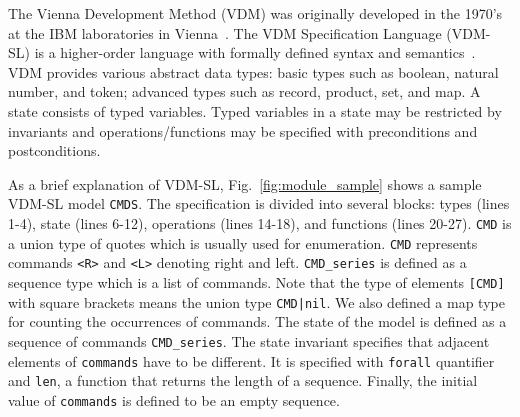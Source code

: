
The Vienna Development Method (VDM) was originally developed in the 1970's at the IBM laboratories in Vienna~\cite{DBLP:conf/fm/1978}. The VDM Specification Language (VDM-SL) is a higher-order language with formally defined syntax and semantics~\cite{Prehn:1991:LNCS551,Larsen1995585}. VDM provides various abstract data types: basic types such as boolean, natural number, and token; advanced types such as record, product, set, and map. A state consists of typed variables. Typed variables in a state may be restricted by invariants and operations/functions may be specified with preconditions and postconditions.

As a brief explanation of VDM-SL, Fig.~\ref{fig:module_sample} shows a sample VDM-SL model {\tt CMDS}. The specification is divided into several blocks: types (lines 1-4), state (lines 6-12), operations (lines 14-18), and functions (lines 20-27). {\tt CMD} is a union type of quotes which is usually used for enumeration. {\tt CMD} represents commands {\tt <R>} and {\tt <L>} denoting right and left. {\tt CMD\_series} is defined as a sequence type which is a list of commands. Note that the type of elements {\tt [CMD]} with square brackets means the union type {\tt CMD|nil}. We also defined a map type for counting the occurrences of commands. The state of the model is defined as a sequence of commands {\tt CMD\_series}. The state invariant specifies that adjacent elements of {\tt commands} have to be different. It is specified with {\tt forall} quantifier and {\tt len}, a function that returns the length of a sequence. Finally, the initial value of \texttt{commands} is defined to be an empty sequence.


